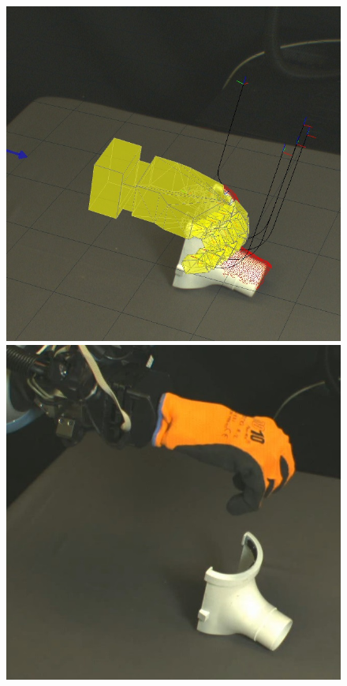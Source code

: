 \begin{figure}
\begin{center}
  \includegraphics[width=\tw]{images/experiments/query/guttering-1-s} \hspace{-6pt}
 \includegraphics[width=\tw]{images/experiments/exec/guttering-s}

\end{center}
\end{figure}
